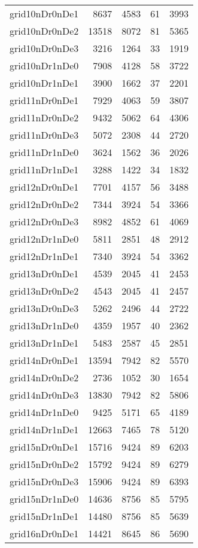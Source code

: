 \begin{longtable}{lrrrr}
grid10nDr0nDe1 & 8637 & 4583 & 61 & 3993 \\
grid10nDr0nDe2 & 13518 & 8072 & 81 & 5365 \\
grid10nDr0nDe3 & 3216 & 1264 & 33 & 1919 \\
grid10nDr1nDe0 & 7908 & 4128 & 58 & 3722 \\
grid10nDr1nDe1 & 3900 & 1662 & 37 & 2201 \\
grid11nDr0nDe1 & 7929 & 4063 & 59 & 3807 \\
grid11nDr0nDe2 & 9432 & 5062 & 64 & 4306 \\
grid11nDr0nDe3 & 5072 & 2308 & 44 & 2720 \\
grid11nDr1nDe0 & 3624 & 1562 & 36 & 2026 \\
grid11nDr1nDe1 & 3288 & 1422 & 34 & 1832 \\
grid12nDr0nDe1 & 7701 & 4157 & 56 & 3488 \\
grid12nDr0nDe2 & 7344 & 3924 & 54 & 3366 \\
grid12nDr0nDe3 & 8982 & 4852 & 61 & 4069 \\
grid12nDr1nDe0 & 5811 & 2851 & 48 & 2912 \\
grid12nDr1nDe1 & 7340 & 3924 & 54 & 3362 \\
grid13nDr0nDe1 & 4539 & 2045 & 41 & 2453 \\
grid13nDr0nDe2 & 4543 & 2045 & 41 & 2457 \\
grid13nDr0nDe3 & 5262 & 2496 & 44 & 2722 \\
grid13nDr1nDe0 & 4359 & 1957 & 40 & 2362 \\
grid13nDr1nDe1 & 5483 & 2587 & 45 & 2851 \\
grid14nDr0nDe1 & 13594 & 7942 & 82 & 5570 \\
grid14nDr0nDe2 & 2736 & 1052 & 30 & 1654 \\
grid14nDr0nDe3 & 13830 & 7942 & 82 & 5806 \\
grid14nDr1nDe0 & 9425 & 5171 & 65 & 4189 \\
grid14nDr1nDe1 & 12663 & 7465 & 78 & 5120 \\
grid15nDr0nDe1 & 15716 & 9424 & 89 & 6203 \\
grid15nDr0nDe2 & 15792 & 9424 & 89 & 6279 \\
grid15nDr0nDe3 & 15906 & 9424 & 89 & 6393 \\
grid15nDr1nDe0 & 14636 & 8756 & 85 & 5795 \\
grid15nDr1nDe1 & 14480 & 8756 & 85 & 5639 \\
grid16nDr0nDe1 & 14421 & 8645 & 86 & 5690 \\

\end{longtable}
